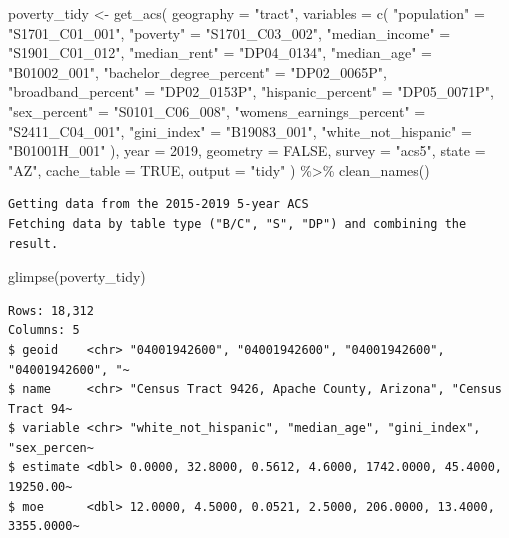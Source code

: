 \documentclass[
  letterpaper,
  DIV=11,
  numbers=noendperiod]{scrreprt}
\newenvironment{Shaded}{\begin{snugshade}}{\end{snugshade}}
\newcommand{\AttributeTok}[1]{\textcolor[rgb]{0.40,0.45,0.13}{#1}}
\newcommand{\ConstantTok}[1]{\textcolor[rgb]{0.56,0.35,0.01}{#1}}
\newcommand{\DecValTok}[1]{\textcolor[rgb]{0.68,0.00,0.00}{#1}}
\newcommand{\FunctionTok}[1]{\textcolor[rgb]{0.28,0.35,0.67}{#1}}
\newcommand{\NormalTok}[1]{\textcolor[rgb]{0.00,0.23,0.31}{#1}}
\newcommand{\OtherTok}[1]{\textcolor[rgb]{0.00,0.23,0.31}{#1}}
\newcommand{\SpecialCharTok}[1]{\textcolor[rgb]{0.37,0.37,0.37}{#1}}
\newcommand{\StringTok}[1]{\textcolor[rgb]{0.13,0.47,0.30}{#1}}
\begin{document}
\begin{Shaded}
\begin{Highlighting}[]
\NormalTok{poverty\_tidy }\OtherTok{\textless{}{-}} \FunctionTok{get\_acs}\NormalTok{(}
  \AttributeTok{geography =} \StringTok{"tract"}\NormalTok{,}
  \AttributeTok{variables =} \FunctionTok{c}\NormalTok{(}
    \StringTok{"population"} \OtherTok{=} \StringTok{"S1701\_C01\_001"}\NormalTok{,}
    \StringTok{"poverty"} \OtherTok{=} \StringTok{"S1701\_C03\_002"}\NormalTok{,}
    \StringTok{"median\_income"} \OtherTok{=} \StringTok{"S1901\_C01\_012"}\NormalTok{,}
    \StringTok{"median\_rent"} \OtherTok{=} \StringTok{"DP04\_0134"}\NormalTok{,}
    \StringTok{"median\_age"} \OtherTok{=} \StringTok{"B01002\_001"}\NormalTok{,}
    \StringTok{"bachelor\_degree\_percent"} \OtherTok{=} \StringTok{"DP02\_0065P"}\NormalTok{,}
    \StringTok{"broadband\_percent"} \OtherTok{=} \StringTok{"DP02\_0153P"}\NormalTok{,}
    \StringTok{"hispanic\_percent"} \OtherTok{=} \StringTok{"DP05\_0071P"}\NormalTok{,}
    \StringTok{"sex\_percent"} \OtherTok{=} \StringTok{"S0101\_C06\_008"}\NormalTok{,}
    \StringTok{"womens\_earnings\_percent"} \OtherTok{=} \StringTok{"S2411\_C04\_001"}\NormalTok{,}
    \StringTok{"gini\_index"} \OtherTok{=} \StringTok{"B19083\_001"}\NormalTok{,}
    \StringTok{"white\_not\_hispanic"} \OtherTok{=} \StringTok{"B01001H\_001"}
\NormalTok{    ),}
  \AttributeTok{year =} \DecValTok{2019}\NormalTok{,}
  \AttributeTok{geometry =} \ConstantTok{FALSE}\NormalTok{,}
  \AttributeTok{survey =} \StringTok{"acs5"}\NormalTok{,}
  \AttributeTok{state =} \StringTok{"AZ"}\NormalTok{,}
  \AttributeTok{cache\_table =} \ConstantTok{TRUE}\NormalTok{,}
  \AttributeTok{output =} \StringTok{"tidy"}
\NormalTok{) }\SpecialCharTok{\%\textgreater{}\%}
  \FunctionTok{clean\_names}\NormalTok{()}
\end{Highlighting}
\end{Shaded}

\begin{verbatim}
Getting data from the 2015-2019 5-year ACS
Fetching data by table type ("B/C", "S", "DP") and combining the result.
\end{verbatim}

\begin{Shaded}
\begin{Highlighting}[]
\FunctionTok{glimpse}\NormalTok{(poverty\_tidy)}
\end{Highlighting}
\end{Shaded}

\begin{verbatim}
Rows: 18,312
Columns: 5
$ geoid    <chr> "04001942600", "04001942600", "04001942600", "04001942600", "~
$ name     <chr> "Census Tract 9426, Apache County, Arizona", "Census Tract 94~
$ variable <chr> "white_not_hispanic", "median_age", "gini_index", "sex_percen~
$ estimate <dbl> 0.0000, 32.8000, 0.5612, 4.6000, 1742.0000, 45.4000, 19250.00~
$ moe      <dbl> 12.0000, 4.5000, 0.0521, 2.5000, 206.0000, 13.4000, 3355.0000~
\end{verbatim}
\end{document}
